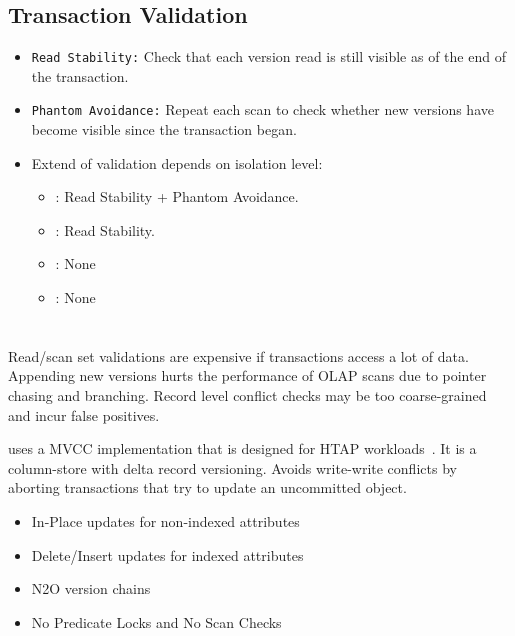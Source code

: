 \documentclass[11pt]{article}
\begin{document}
\subsection*{Transaction Validation}
\begin{itemize}
    \item \texttt{Read Stability:}
    Check that each version read is still visible as of the end of 
    the transaction.
    
    \item \texttt{Phantom Avoidance:}
    Repeat each scan to check whether new versions have become visible since the transaction began.
    
    \item Extend of validation depends on isolation level:
    \begin{itemize}
        \item {}: Read Stability + Phantom Avoidance.
        \item {}: Read Stability.
        \item {}: None
        \item {}: None
    \end{itemize}
\end{itemize}

\section{}
Read/scan set validations are expensive if transactions access a lot of data. Appending new versions 
hurts the performance of OLAP scans due to pointer chasing and branching. Record level conflict 
checks may be too coarse-grained and incur false positives.

 uses a MVCC implementation that is designed for HTAP workloads~\cite{p677-neumann}. 
It is a column-store with delta record versioning. Avoids write-write conflicts by aborting 
transactions that try to update an uncommitted object.
\begin{itemize}
    \item In-Place updates for non-indexed attributes
    \item Delete/Insert updates for indexed attributes
    \item N2O version chains
    \item No Predicate Locks and No Scan Checks
\end{itemize}
\end{document}
